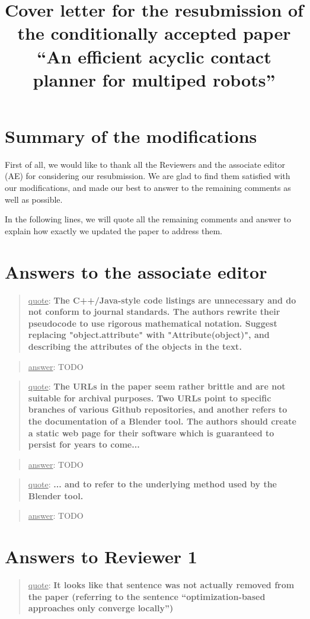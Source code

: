 \documentclass[a4paper]{article}
\author {}
\title {Cover letter for the resubmission of the conditionally accepted paper ``An efficient acyclic contact planner for multiped robots''}
\date {}
\newcommand{\ndone}[0]{\textcolor{red}{TODO}}
\newcommand\quot[1]{\begin{quote} \underline{quote}: \textbf{#1}\end{quote}}
\newcommand\as[1]{\begin{quote} \underline{answer}: {#1}\end{quote} }
\begin{document}
\maketitle

\section{Summary of the modifications}

First of all, we would like to thank all the Reviewers and the associate editor (AE) for considering our resubmission.
We are glad to find them satisfied with our modifications, and made our best to answer to the remaining comments as well as possible.

In the following lines, we will quote all the remaining comments and answer to explain how exactly we updated the paper to address them.


\section{Answers to the associate editor}

\quot {The C++/Java-style code listings are unnecessary and do not conform
to journal standards.  The authors rewrite their pseudocode to use
rigorous mathematical notation.  Suggest replacing "object.attribute"
with "Attribute(object)", and describing the attributes of the objects
in the text.
}

\as{TODO}

\quot {The URLs in the paper seem rather brittle and are not suitable for
archival purposes.  Two URLs point to specific branches of various
Github repositories, and another refers to the documentation of a
Blender tool.  The authors should create a static web page for their
software which is guaranteed to persist for years to come... }

\as{TODO}

\quot {... and to refer
to the underlying method used by the Blender tool.}

\as{TODO}

\section{Answers to Reviewer 1}

\quot {It looks like that sentence was not actually removed from the
paper (referring to the sentence ``optimization-based approaches
only converge locally'')
}
\end{document}
